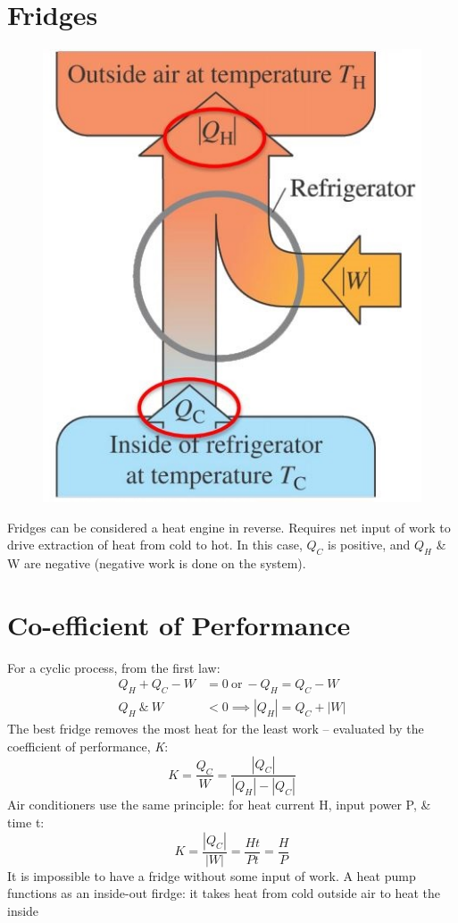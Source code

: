\documentclass[a4paper, 11pt, normalem]{report}
\begin{document}
\section{Fridges}
\begin{figure}
    \centering
    \includegraphics[scale=0.7]{Fridge.jpg}
\end{figure}
Fridges can be considered a heat engine in reverse.
Requires net input of work to drive extraction of heat from cold to hot.
In this case, $Q_{C}$ is positive, and $Q_{H}$ \& W are negative (negative work is done on the system).

\section{Co-efficient of Performance}
For a cyclic process, from the first law:
\begin{align}
    Q_{H} + Q_{C} - W &= 0 ~\text{or}~ -Q_{H} = Q_{C} - W \\
    Q_{H} ~\&~ W &< 0 \implies |Q_{H}| = Q_{C} + |W|
\end{align}
The best fridge removes the most heat for the least work -- evaluated by the coefficient of performance, \emph{K}:
\begin{equation}
	K = \frac{Q_{C}}{W} = \frac{|Q_{C}|}{|Q_{H}| - |Q_{C}|}
\end{equation}
Air conditioners use the same principle: for heat current H, input power P, \& time t:
\begin{equation}
	K = \frac{|Q_{C}|}{|W|} = \frac{Ht}{Pt} = \frac{H}{P}
\end{equation}
It is impossible to have a fridge without some input of work.
A heat pump functions as an inside-out firdge: it takes heat from cold outside air to heat the inside
\end{document}
